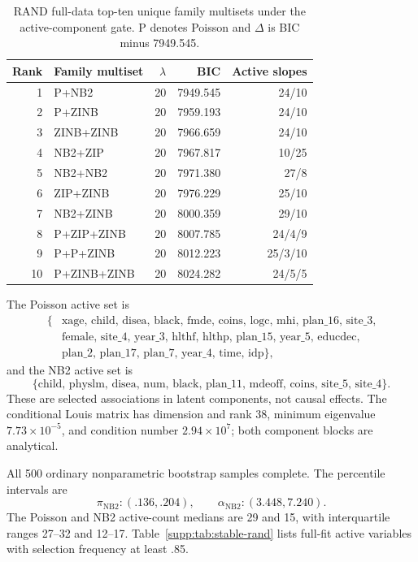\documentclass[a4paper,fleqn]{cas-sc}
\numberwithin{equation}{section}
\begin{document}
\begin{table}[t]
\centering
\caption{RAND full-data top-ten unique family multisets under the active-component gate. P denotes Poisson and $\Delta$ is BIC minus 7949.545.}
\label{supp:tab:rand-leaderboard}
\small
\begin{tabular}{rlrrr}
\toprule
Rank & Family multiset & $\lambda$ & BIC & Active slopes\\
\midrule
1 & P+NB2 & 20 & 7949.545 & 24/10\\
2 & P+ZINB & 20 & 7959.193 & 24/10\\
3 & ZINB+ZINB & 20 & 7966.659 & 24/10\\
4 & NB2+ZIP & 20 & 7967.817 & 10/25\\
5 & NB2+NB2 & 20 & 7971.380 & 27/8\\
6 & ZIP+ZINB & 20 & 7976.229 & 25/10\\
7 & NB2+ZINB & 20 & 8000.359 & 29/10\\
8 & P+ZIP+ZINB & 20 & 8007.785 & 24/4/9\\
9 & P+P+ZINB & 20 & 8012.223 & 25/3/10\\
10 & P+ZINB+ZINB & 20 & 8024.282 & 24/5/5\\
\bottomrule
\end{tabular}
\end{table}

The Poisson active set is
\[
\begin{split}
\{&\text{xage, child, disea, black, fmde, coins, logc, mhi, plan\_16, site\_3,}\\
 &\text{female, site\_4, year\_3, hlthf, hlthp, plan\_15, year\_5, educdec,}\\
 &\text{plan\_2, plan\_17, plan\_7, year\_4, time, idp}\},
\end{split}
\]
and the NB2 active set is
\[
 \{\text{child, physlm, disea, num, black, plan\_11, mdeoff, coins, site\_5, site\_4}\}.
\]
These are selected associations in latent components, not causal effects. The conditional Louis matrix has dimension and rank 38, minimum eigenvalue $7.73\times10^{-5}$, and condition number $2.94\times10^7$; both component blocks are analytical.

All 500 ordinary nonparametric bootstrap samples complete. The percentile intervals are
\[
 \pi_{\mathrm{NB2}}:(.136,.204),\qquad
 \alpha_{\mathrm{NB2}}:(3.448,7.240).
\]
The Poisson and NB2 active-count medians are 29 and 15, with interquartile ranges 27--32 and 12--17. Table~\ref{supp:tab:stable-rand} lists full-fit active variables with selection frequency at least .85.
\end{document}
